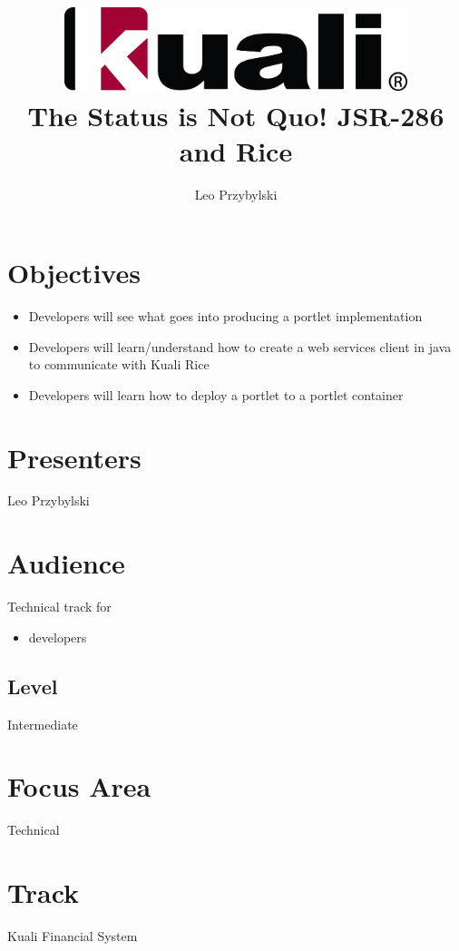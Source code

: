 \documentclass[12pt,notitlepage]{article}
\author{Leo Przybylski}
\title{\includegraphics[width=0.75\textwidth]{kuali_base.png}\\The Status is Not Quo! JSR-286 and Rice}
\date{}
\begin{document}
\maketitle
{}
\section{Objectives}
\begin{itemize}
\item Developers will see what goes into producing a portlet implementation
\item Developers will learn/understand how to create a web services client in java to communicate with Kuali Rice
\item Developers will learn how to deploy a portlet to a portlet
  container
\end{itemize}

\section{Presenters}
Leo Przybylski

\section{Audience}
Technical track for
\begin{itemize}
\item developers
\end{itemize}


\subsection{Level}
Intermediate

\section{Focus Area}
Technical

\section{Track}
Kuali Financial System
\end{document}
